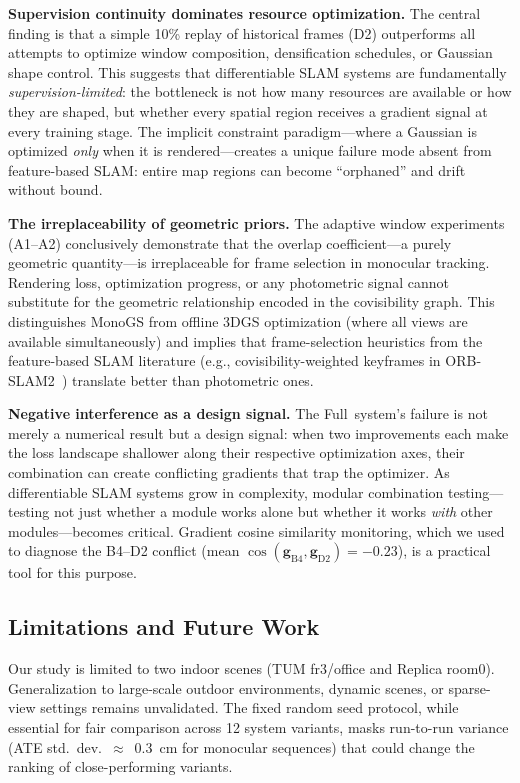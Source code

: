 \documentclass[conference]{IEEEtran}
\begin{document}
\textbf{Supervision continuity dominates resource optimization.}
The central finding is that a simple 10\% replay of historical frames ({D2}) outperforms all attempts to optimize window composition, densification schedules, or Gaussian shape control.
This suggests that differentiable SLAM systems are fundamentally \textit{supervision-limited}: the bottleneck is not how many resources are available or how they are shaped, but whether every spatial region receives a gradient signal at every training stage.
The implicit constraint paradigm---where a Gaussian is optimized \textit{only} when it is rendered---creates a unique failure mode absent from feature-based SLAM: entire map regions can become ``orphaned'' and drift without bound.

\textbf{The irreplaceability of geometric priors.}
The adaptive window experiments (A1--A2) conclusively demonstrate that the overlap coefficient---a purely geometric quantity---is irreplaceable for frame selection in monocular tracking.
Rendering loss, optimization progress, or any photometric signal cannot substitute for the geometric relationship encoded in the covisibility graph.
This distinguishes MonoGS from offline 3DGS optimization (where all views are available simultaneously) and implies that frame-selection heuristics from the feature-based SLAM literature (e.g., covisibility-weighted keyframes in ORB-SLAM2~\cite{orbslam2}) translate better than photometric ones.

\textbf{Negative interference as a design signal.}
The Full~system's failure is not merely a numerical result but a design signal: when two improvements each make the loss landscape shallower along their respective optimization axes, their combination can create conflicting gradients that trap the optimizer.
As differentiable SLAM systems grow in complexity, modular combination testing---testing not just whether a module works alone but whether it works \textit{with} other modules---becomes critical.
Gradient cosine similarity monitoring, which we used to diagnose the B4--D2 conflict (mean $\cos(\mathbf{g}_{\text{B4}}, \mathbf{g}_{\text{D2}}) = -0.23$), is a practical tool for this purpose.

\subsection{Limitations and Future Work}

Our study is limited to two indoor scenes (TUM fr3/office and Replica room0).
Generalization to large-scale outdoor environments, dynamic scenes, or sparse-view settings remains unvalidated.
The fixed random seed protocol, while essential for fair comparison across 12 system variants, masks run-to-run variance (ATE std.~dev.~$\approx$~0.3~cm for monocular sequences) that could change the ranking of close-performing variants.
\end{document}
